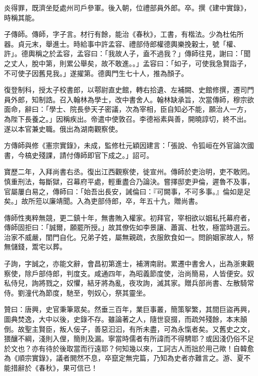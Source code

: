 \begin{pinyinscope}
 炎得罪，既濟坐貶處州司戶參軍。後入朝，位禮部員外郎。卒。撰《建中實錄》，時稱其能。



 子傳師。傳師，字子言。材行有餘，能治《春秋》，工書，有楷法。少為杜佑所器。貞元末，舉進士。時給事中許孟容、禮部侍郎權德輿樂挽轂士，號「權、許」。德輿稱之於孟容，孟容曰：「我故人子，盍不過我？」傳師往見，謝曰：「聞之丈人，脫中第，則累公舉矣，故不敢進。。」孟容曰：「如子，可使我急賢詣子，不可使子因舊見我。」遂擢第。德輿門生七十人，推為顏子。



 復登制科，授太子校書郎，以鄠尉直史館，轉右拾遺、左補闕、史館修撰，遷司門員外郎，知制誥。召入翰林為學士，改中書舍人。翰林缺承旨，次當傳師，穆宗欲面命，辭曰：「學士、院長參天子密議，次為宰相，臣自知必不能，願治人一方，為陛下長養之。」因稱疾出。帝遣中使敦召。李德裕素與善，開曉諄切，終不出。遂以本官兼史職。俄出為湖南觀察使。



 方傳師與修《憲宗實錄》，未成，監修杜元穎因建言：「張說、令狐峘在外官論次國書，今槁史殘課，請付傳師即官下成之。」詔可。



 寶歷二年，入拜尚書右丞。復出江西觀察使，徙宣州。傳師於吏治明，吏不敢罔。慎重刑法，每斷獄，召幕府平處，輕重盡合乃論決。嘗擇邸吏尹倫，遲魯不及事，官屬屢白易之，傳師曰：「始吾出長安，誡倫曰：『可闕事，不可多事。』倫如是足矣。」故所蒞以廉靖聞。入為吏部侍郎，卒，年五十九，贈尚書。



 傳師性夷粹無競，更二鎮十年，無書賄入權家。初拜官，宰相欲以姻私托幕府者，傳師固拒曰：「誠爾，願罷所授。」故其僚佐如李景讓、蕭寘、杜牧，極當時選云。治家不威嚴，閨門自化。兄弟子姓，屬無親疏，衣服飲食如一。問餉姻家故人，帑無儲錢，鬻宅以葬。



 子詢，字誠之，亦能文辭，會昌初第進士，補渭南尉。累遷中書舍人，出為浙東觀察使，除戶部侍郎，判度支。咸通四年，為昭義節度使，治尚簡易，人皆便安。奴私侍兒，詢將戮之，奴懼，結牙將為亂，夜攻詢，滅其家。贈兵部尚書、左散騎常侍。劉潼代為節度，馳至，刳奴心，祭其靈坐。



 贊曰：唐興，史官秉筆眾矣。然垂三百年，業巨事叢，簡策挐繁，其間巨盜再興，圖典焚逸，大中以後，史錄不存。雖論著之人，隨世裒掇，而疏舛殘餘，本末顛倒。故聖主賢臣，叛人佞子，善惡汩汩，有所未盡，可為永愾者矣。又舊史之文，猥釀不綱，淺則入俚，簡則及漏。寧當時儒者有所諱而不得騁耶？或因淺仍俗不足於文也？亦有待於後取當而行遠耶？何知幾以來，工訶古人而拙於用己歟！自韓愈為《順宗實錄》，議者閧然不息，卒竄定無完篇，乃知為史者亦難言之。游、夏不能措辭於《春秋》，果可信已！



\end{pinyinscope}